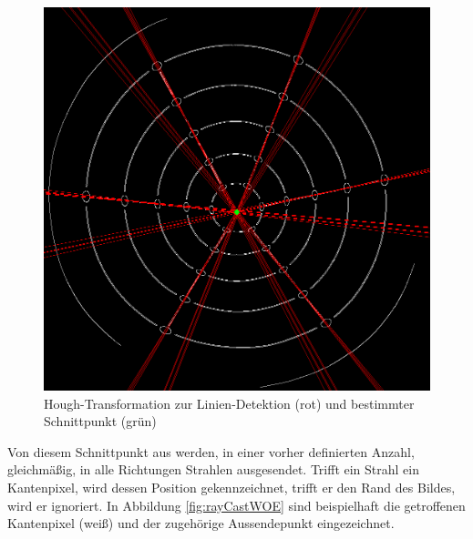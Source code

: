 \begin{figure}[!htb]
	\centering
	\includegraphics[scale=.25]{images/houghLines.png}
	\caption{Hough-Transformation zur Linien-Detektion (rot) und bestimmter Schnittpunkt (grün) }
	\label{fig:houghLines}
\end{figure}

Von diesem Schnittpunkt aus werden, in einer vorher definierten Anzahl, gleichmäßig, in alle Richtungen Strahlen ausgesendet.
Trifft ein Strahl ein Kantenpixel, wird dessen Position gekennzeichnet, trifft er den Rand des Bildes, wird er ignoriert. In Abbildung \ref{fig:rayCastWOE} sind beispielhaft die getroffenen Kantenpixel (weiß) und der zugehörige Aussendepunkt eingezeichnet.

